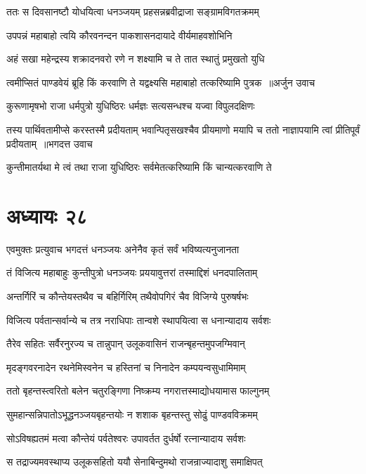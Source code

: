 \twolineshloka
{ततः स दिवसानष्टौ योधयित्वा धनञ्जयम्}
{प्रहसन्नब्रवीद्राजा सङ्ग्रामविगतक्रमम्}


\twolineshloka
{उपपन्नं महाबाहो त्वयि कौरवनन्दन}
{पाकशासनदायादे वीर्यमाहवशोभिनि}


\twolineshloka
{अहं सखा महेन्द्रस्य शक्रादनवरो रणे}
{न शक्ष्यामि च ते तात स्थातुं प्रमुखतो युधि}


\twolineshloka
{त्वमीप्सितं पाण्डवेयं ब्रूहि किं करवाणि ते}
{यद्वक्ष्यसि महाबाहो तत्करिष्यामि पुत्रक ॥अर्जुन उवाच}


\twolineshloka
{कुरूणामृषभो राजा धर्मपुत्रो युधिष्ठिरः}
{धर्मज्ञः सत्यसन्धश्च यज्वा विपुलदक्षिणः}


\fourlineindentedshloka
{तस्य पार्थिवतामीप्से करस्तस्मै प्रदीयताम्}
{भवान्पितृसखश्चैव प्रीयमाणो मयापि च}
{ततो नाज्ञापयामि त्वां प्रीतिपूर्वं प्रदीयताम् ॥भगदत्त उवाच}
{}


\twolineshloka
{कुन्तीमातर्यथा मे त्वं तथा राजा युधिष्ठिरः}
{सर्वमेतत्करिष्यामि किं चान्यत्करवाणि ते}


\chapter{अध्यायः २८}
\twolineshloka
{एवमुक्तः प्रत्युवाच भगदत्तं धनञ्जयः}
{अनेनैव कृतं सर्वं भविष्यत्यनुजानता}


\twolineshloka
{तं विजित्य महाबाहुः कुन्तीपुत्रो धनञ्जयः}
{प्रययावुत्तरां तस्माद्दिशं धनदपालिताम्}


\twolineshloka
{अन्तर्गिरिं च कौन्तेयस्तथैव च बहिर्गिरिम्}
{तथैवोपगिरं चैव विजिग्ये पुरुषर्षभः}


\twolineshloka
{विजित्य पर्वतान्सर्वान्ये च तत्र नराधिपाः}
{तान्वशे स्थापयित्वा स धनान्यादाय सर्वशः}


\twolineshloka
{तैरेव सहितः सर्वैरनुरज्य च तान्नुपान्}
{उलूकवासिनं राजन्बृहन्तमुपजग्मिवान्}


\twolineshloka
{मृदङ्गवरनादेन रथनेमिस्वनेन च}
{हस्तिनां च निनादेन कम्पयन्वसुधामिमाम्}


\twolineshloka
{ततो बृहन्तस्त्वरितो बलेन चतुरङ्गिणा}
{निष्क्रम्य नगरात्तस्माद्योधयामास फाल्गुनम्}


\twolineshloka
{सुमहान्सन्निपातोऽभूद्धनञ्जयबृहन्तयोः}
{न शशाक बृहन्तस्तु सोढुं पाण्डवविक्रमम्}


\twolineshloka
{सोऽविषह्यतमं मत्वा कौन्तेयं पर्वतेश्वरः}
{उपावर्तत दुर्धर्षो रत्नान्यादाय सर्वशः}


\twolineshloka
{स तद्राज्यमवस्थाप्य उलूकसहितो ययौ}
{सेनाबिन्दुमथो राजन्राज्यादाशु समाक्षिपत्}


